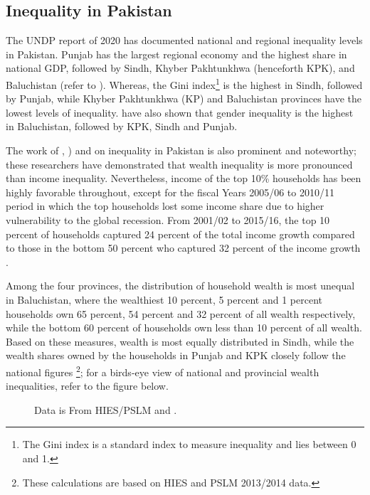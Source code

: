 \documentclass[12pt]{article}
\newcommand{\1}{\mathbbm 1}
\begin{document}
\subsection{Inequality in Pakistan}

	
	The UNDP report of 2020 has documented national and regional inequality levels in Pakistan. Punjab has the largest regional economy and the highest share in national GDP, followed by Sindh, Khyber Pakhtunkhwa (henceforth KPK), and Baluchistan (refer to \cite{hafizpasha2020}). Whereas, the Gini index\footnote{The Gini index is a standard index to measure inequality and lies between 0 and 1.} is the highest in Sindh, followed by Punjab, while Khyber Pakhtunkhwa (KP) and Baluchistan provinces have the lowest levels of inequality. \cite{hafizpasha2020} have also shown that gender inequality is the highest in Baluchistan, followed by KPK, Sindh and Punjab.
	
	 The work of \cite{burki2015multiple}, \cite{burki2020exploring}) and \cite{burki2021LUMS} on inequality in Pakistan is also prominent and noteworthy; these researchers have demonstrated that wealth inequality is more pronounced than income inequality. Nevertheless, income of the top 10\% households has been highly favorable throughout, except for the fiscal Years 2005/06 to 2010/11 period in which the top households lost some income share due to higher vulnerability to the global recession. From 2001/02 to 2015/16, the top 10 percent of households captured 24 percent of the total income growth compared to those in the bottom 50 percent who captured 32 percent of the income growth \cite{burki2021LUMS}. 
	 
	 
	 Among the four provinces, the distribution of household wealth is most unequal in Baluchistan, where the wealthiest 10 percent, 5 percent and 1 percent households own 65 percent, 54 percent and 32 percent of all wealth respectively, while the bottom 60 percent of households own less than 10 percent of all wealth. Based on these measures, wealth is most equally distributed in Sindh, while the wealth shares owned by the households in Punjab and KPK closely follow the national figures \cite{burki2021LUMS}\footnote{These calculations are based on HIES and PSLM 2013/2014 data.}; for a birds-eye view of national and provincial wealth inequalities, refer to the figure below.
	 
	 
	 \begin{figure}[H]
	 	\centering
	 	\scalebox{0.8}{}
	 	\hfill
	 	\caption{Data is From HIES/PSLM and \cite{burki2021LUMS}.}
	 \end{figure}
	 
\end{document}
